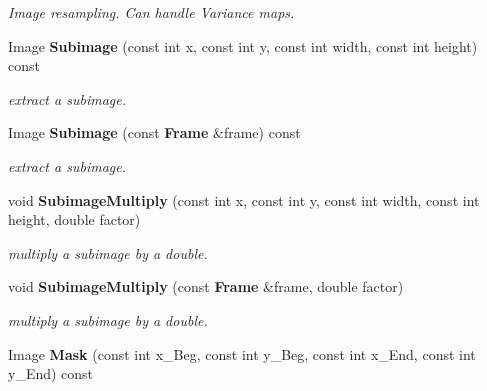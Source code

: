 \begin{CompactItemize}
\begin{CompactList}\small\item\em Image resampling. Can handle Variance maps.\item\end{CompactList}\item 
{}
Image {\bf Subimage} (const int x, const int y, const int width, const int height) const\label{class_image_a47}

\begin{CompactList}\small\item\em extract a subimage.\item\end{CompactList}\item 
{}
Image {\bf Subimage} (const {\bf Frame} \&frame) const\label{class_image_a48}

\begin{CompactList}\small\item\em extract a subimage.\item\end{CompactList}\item 
{}
void {\bf Subimage\-Multiply} (const int x, const int y, const int width, const int height, double factor)\label{class_image_a49}

\begin{CompactList}\small\item\em multiply a subimage by a double.\item\end{CompactList}\item 
{}
void {\bf Subimage\-Multiply} (const {\bf Frame} \&frame, double factor)\label{class_image_a50}

\begin{CompactList}\small\item\em multiply a subimage by a double.\item\end{CompactList}\item 
{}
Image {\bf Mask} (const int x\_\-Beg, const int y\_\-Beg, const int x\_\-End, const int y\_\-End) const\label{class_image_a51}


\end{CompactItemize}
